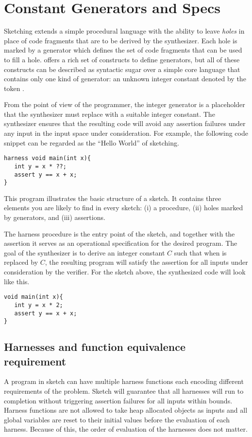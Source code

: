 \section{Constant Generators and Specs}

Sketching extends a simple procedural language with the ability to leave \emph{holes} in place of code fragments that are to be derived by the synthesizer. Each hole is marked by a generator which defines the set of code fragments that can be used to fill a hole. \Sk{} offers a rich set of constructs to define generators, but all of these constructs can be described as syntactic sugar over a simple core language that contains only one kind of generator: an unknown integer constant denoted by the token .

From the point of view of the programmer, the integer generator is a placeholder that the synthesizer must replace with a suitable integer constant. The synthesizer ensures that the resulting code will avoid any assertion failures under any input in the input space under consideration. For example, the following code snippet can be regarded as the ``Hello World'' of sketching.
\begin{lstlisting}
harness void main(int x){
   int y = x * ??;
   assert y == x + x;
}
\end{lstlisting}
This program illustrates the basic structure of a sketch. It contains three elements you are likely to find in every sketch: (i) a  procedure, (ii) holes marked by generators, and (iii) assertions.

The harness procedure is the entry point of the sketch, and together with the assertion it serves as an operational specification for the desired program. The goal of the synthesizer is to derive an integer constant $C$ such that when  is replaced by $C$, the resulting program will satisfy the assertion for all inputs under consideration by the verifier. For the sketch above, the synthesized code will look like this. 
\begin{lstlisting}
void main(int x){
   int y = x * 2;
   assert y == x + x;
}
\end{lstlisting}


\subsection{Harnesses and function equivalence requirement}
A program in sketch can have multiple harness functions each encoding different requirements of the problem. Sketch will guarantee that all harnesses will run to completion without triggering assertion failures for all inputs within bounds. Harness functions are not allowed to take heap allocated objects as inputs and all global variables are reset to their initial values before the evaluation of each harness. Because of this, the order of evaluation of the harnesses does not matter. 

